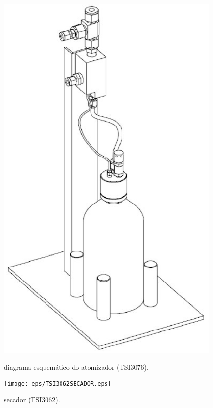 \begin{figure}[hbt]
\begin{center}
\includegraphics[scale=0.5]{eps/TSI3076ATOMIZADOR.eps}\\
\end{center}
\caption{\label{TSI3074FILTRO}\hspace{-0.1em} diagrama esquem\'{a}tico do atomizador (TSI3076).}
\end{figure}

\begin{figure}[hbt]
\begin{center}
\texttt{[image: eps/TSI3062SECADOR.eps]}\\
\end{center}
\caption{\label{TSI3062SECADOR}\hspace{-0.1em} secador (TSI3062).}
\end{figure}



